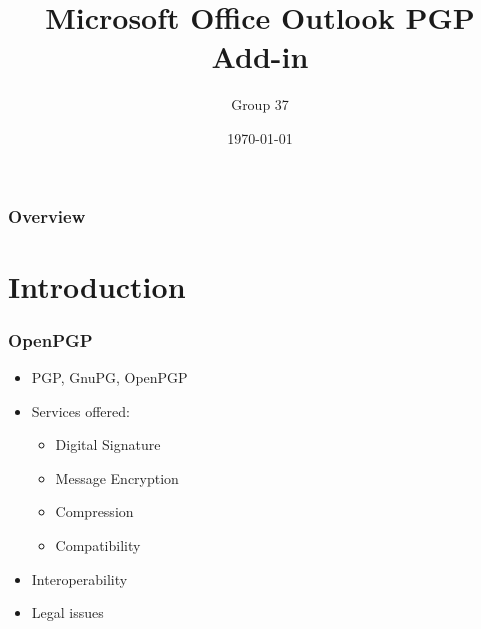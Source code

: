 \documentclass{beamer}
\title[Simple PGP]{Microsoft Office Outlook PGP Add-in} %
\author{Group 37} %
\institute[EMDC] %
{
Instituto Superior Tecnico \\ %
\medskip
}
\date{\today} %
\begin{document}
\begin{frame}
\titlepage %
\end{frame}

\begin{frame}
\frametitle{Overview} %
\tableofcontents %
\end{frame}


\section{Introduction} %

\begin{frame}
\frametitle{OpenPGP}
\begin{itemize}
\item PGP, GnuPG, OpenPGP
\item Services offered: 
\begin{itemize}
\item Digital Signature
\item Message Encryption
\item Compression
\item Compatibility
\end{itemize}
\item Interoperability
\item Legal issues
\end{itemize}
\end{frame}
\end{document}
